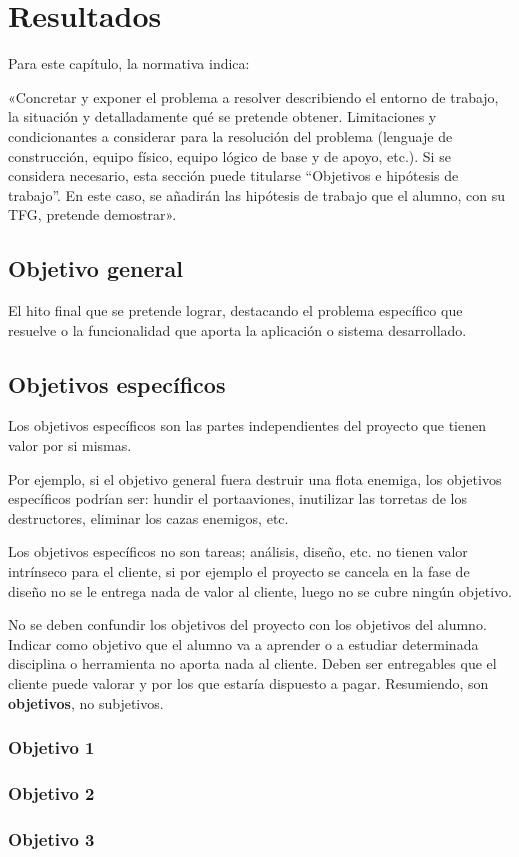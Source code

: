\chapter{Resultados}
\label{chap:resultados}

\noindent
Para este capítulo, la normativa indica:

«Concretar y exponer el problema a resolver describiendo el entorno de trabajo,
la situación y detalladamente qué se pretende obtener. Limitaciones y
condicionantes a considerar para la resolución del problema (lenguaje de
construcción, equipo físico, equipo lógico de base y de apoyo, etc.). Si se
considera necesario, esta sección puede titularse ``Objetivos e hipótesis de
trabajo''. En este caso, se añadirán las hipótesis de trabajo que el alumno, con
su TFG, pretende demostrar».

\section{Objetivo general}

El hito final que se pretende lograr, destacando el problema específico que
resuelve o la funcionalidad que aporta la aplicación o sistema desarrollado.


\section{Objetivos específicos}

Los objetivos específicos son las partes independientes del proyecto que tienen
valor por si mismas.

Por ejemplo, si el objetivo general fuera destruir una flota enemiga, los
objetivos específicos podrían ser: hundir el portaaviones, inutilizar las
torretas de los destructores, eliminar los cazas enemigos, etc.

Los objetivos específicos no son tareas; análisis, diseño, etc. no tienen valor
intrínseco para el cliente, si por ejemplo el proyecto se cancela en la fase de
diseño no se le entrega nada de valor al cliente, luego no se cubre ningún
objetivo.

No se deben confundir los objetivos del proyecto con los objetivos del
alumno. Indicar como objetivo que el alumno va a aprender o a estudiar
determinada disciplina o herramienta no aporta nada al cliente. Deben ser
entregables que el cliente puede valorar y por los que estaría dispuesto
a pagar. Resumiendo, son \textbf{objetivos}, no subjetivos.

\subsection{Objetivo 1}

\subsection{Objetivo 2}

\subsection{Objetivo 3}


